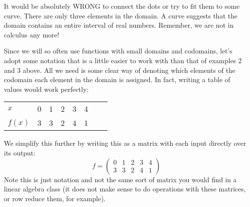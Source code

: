 \documentclass[10pt,]{book}
\theoremstyle{plain}
\theoremstyle{definition}
\theoremstyle{definition}
\theoremstyle{definition}
\newcommand{\hrulethin}  {\noalign{\hrule height 0.04em}}
\newcommand{\amp}{ & }
\begin{document}
      It would be absolutely WRONG to connect the dots or try to fit them to some curve. There are only three elements in the domain. A curve suggests that the domain contains an entire interval of real numbers. Remember, we are not in calculus any more!
\par

      Since we will so often use functions with small domains and codomains, let's adopt some notation that is a little easier to work with than that of examples 2 and 3 above.  All we need is some clear way of denoting which elements of the codomain each element in the domain is assigned.  In fact, writing a table of values would work perfectly:

      \leavevmode%
\begin{table}
\centering
\begin{tabular}{lAllllll}
\(x\)&0&1&2&3&4\tabularnewline\hrulethin
\(f(x)\)&3&3&2&4&1
\end{tabular}
\end{table}

%
\par

      We simplify this further by writing this as a matrix with each input directly over its output:
      \begin{equation*}
        f = \begin{pmatrix}0 \amp 1 \amp 2\amp 3 \amp 4 \\ 3 \amp 3 \amp 2 \amp 4 \amp 1\end{pmatrix}
      \end{equation*}
      Note this is just notation and not the same sort of matrix you would find in a linear algebra class (it does not make sense to do operations with these matrices, or row reduce them, for example).
\par
\end{document}
